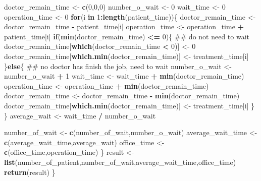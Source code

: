 \documentclass[]{article}
\newenvironment{Shaded}{\begin{snugshade}}{\end{snugshade}}
\newcommand{\KeywordTok}[1]{\textcolor[rgb]{0.13,0.29,0.53}{\textbf{#1}}}
\newcommand{\DecValTok}[1]{\textcolor[rgb]{0.00,0.00,0.81}{#1}}
\newcommand{\StringTok}[1]{\textcolor[rgb]{0.31,0.60,0.02}{#1}}
\newcommand{\ControlFlowTok}[1]{\textcolor[rgb]{0.13,0.29,0.53}{\textbf{#1}}}
\newcommand{\OperatorTok}[1]{\textcolor[rgb]{0.81,0.36,0.00}{\textbf{#1}}}
\newcommand{\NormalTok}[1]{#1}
\begin{document}
\begin{Shaded}
\begin{Highlighting}[]
        
\NormalTok{        doctor_remain_time <-}\StringTok{ }\KeywordTok{c}\NormalTok{(}\DecValTok{0}\NormalTok{,}\DecValTok{0}\NormalTok{,}\DecValTok{0}\NormalTok{)}
\NormalTok{        number_o_wait <-}\StringTok{ }\DecValTok{0}
\NormalTok{        wait_time <-}\StringTok{ }\DecValTok{0}
\NormalTok{        operation_time <-}\StringTok{ }\DecValTok{0}
        \ControlFlowTok{for}\NormalTok{(i }\ControlFlowTok{in} \DecValTok{1}\OperatorTok{:}\KeywordTok{length}\NormalTok{(patient_time))\{}
\NormalTok{                doctor_remain_time <-}\StringTok{ }\NormalTok{doctor_remain_time }\OperatorTok{-}\StringTok{ }\NormalTok{patient_time[i]}
\NormalTok{                operation_time <-}\StringTok{ }\NormalTok{operation_time }\OperatorTok{+}\StringTok{ }\NormalTok{patient_time[i]}
                \ControlFlowTok{if}\NormalTok{(}\KeywordTok{min}\NormalTok{(doctor_remain_time) }\OperatorTok{<=}\StringTok{ }\DecValTok{0}\NormalTok{)\{                        ## do not need to wait}
\NormalTok{                        doctor_remain_time[}\KeywordTok{which}\NormalTok{(doctor_remain_time }\OperatorTok{<}\StringTok{ }\DecValTok{0}\NormalTok{)] <-}\StringTok{ }\DecValTok{0}
\NormalTok{                        doctor_remain_time[}\KeywordTok{which.min}\NormalTok{(doctor_remain_time)] <-}\StringTok{  }\NormalTok{treatment_time[i] }
\NormalTok{                \}}\ControlFlowTok{else}\NormalTok{\{                                                   ## no doctor has finish the job, need to wait}
\NormalTok{                        number_o_wait <-}\StringTok{ }\NormalTok{number_o_wait }\OperatorTok{+}\StringTok{ }\DecValTok{1}
\NormalTok{                        wait_time <-}\StringTok{ }\NormalTok{wait_time }\OperatorTok{+}\StringTok{ }\KeywordTok{min}\NormalTok{(doctor_remain_time)}
\NormalTok{                        operation_time <-}\StringTok{ }\NormalTok{operation_time }\OperatorTok{+}\StringTok{ }\KeywordTok{min}\NormalTok{(doctor_remain_time)}
\NormalTok{                        doctor_remain_time <-}\StringTok{ }\NormalTok{doctor_remain_time }\OperatorTok{-}\StringTok{ }\KeywordTok{min}\NormalTok{(doctor_remain_time)}
\NormalTok{                        doctor_remain_time[}\KeywordTok{which.min}\NormalTok{(doctor_remain_time)] <-}\StringTok{ }\NormalTok{treatment_time[i]}
\NormalTok{                \}}
\NormalTok{        \}}
\NormalTok{        average_wait <-}\StringTok{ }\NormalTok{wait_time }\OperatorTok{/}\StringTok{ }\NormalTok{number_o_wait}
        
\NormalTok{        number_of_wait <-}\StringTok{ }\KeywordTok{c}\NormalTok{(number_of_wait,number_o_wait)}
\NormalTok{        average_wait_time <-}\StringTok{ }\KeywordTok{c}\NormalTok{(average_wait_time,average_wait)}
\NormalTok{        office_time <-}\StringTok{ }\KeywordTok{c}\NormalTok{(office_time,operation_time)}
\NormalTok{\}}
\NormalTok{        result <-}\StringTok{ }\KeywordTok{list}\NormalTok{(number_of_patient,number_of_wait,average_wait_time,office_time)}
        \KeywordTok{return}\NormalTok{(result)}
\NormalTok{\}}
\end{Highlighting}
\end{Shaded}
\end{document}
